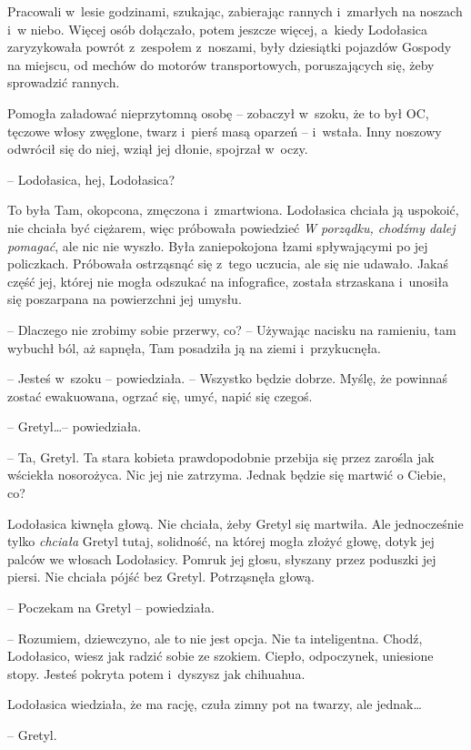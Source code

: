 \documentclass[oneside,polish,11pt,sfheadings]{mwbk}
\begin{document}
Pracowali w~lesie godzinami, szukając, zabierając rannych i~zmarłych na
noszach i~w niebo. Więcej osób dołączało, potem jeszcze więcej, a~kiedy
Lodołasica zaryzykowała powrót z~zespołem z~noszami, były dziesiątki
pojazdów Gospody na miejscu, od mechów do motorów transportowych,
poruszających się, żeby sprowadzić rannych.

Pomogła załadować nieprzytomną osobę -- zobaczył w~szoku, że to był OC,
tęczowe włosy zwęglone, twarz i~pierś masą oparzeń -- i~wstała. Inny
noszowy odwrócił się do niej, wziął jej dłonie, spojrzał w~oczy.

-- Lodołasica, hej, Lodołasica?

To była Tam, okopcona, zmęczona i~zmartwiona. Lodołasica chciała ją
uspokoić, nie chciała być ciężarem, więc próbowała powiedzieć \textit{W
porządku, chodźmy dalej pomagać}, ale nic nie wyszło. Była zaniepokojona
łzami spływającymi po jej policzkach. Próbowała ostrząsnąć się z~tego
uczucia, ale się nie udawało. Jakaś część jej, której nie mogła odszukać
na infografice, została strzaskana i~unosiła się poszarpana na
powierzchni jej umysłu.

-- Dlaczego nie zrobimy sobie przerwy, co? -- Używając nacisku na
ramieniu, tam wybuchł ból, aż sapnęła, Tam posadziła ją na ziemi i~przykucnęła. 

-- Jesteś w~szoku -- powiedziała. -- Wszystko będzie dobrze.
Myślę, że powinnaś zostać ewakuowana, ogrzać się, umyć, napić się
czegoś.

-- Gretyl\ldots  -- powiedziała.

-- Ta, Gretyl. Ta stara kobieta prawdopodobnie przebija się przez zarośla
jak wściekła nosorożyca. Nic jej nie zatrzyma. Jednak będzie się martwić
o Ciebie, co?

Lodołasica kiwnęła głową. Nie chciała, żeby Gretyl się martwiła. Ale
jednocześnie tylko \textit{chciała} Gretyl tutaj, solidność, na której
mogła złożyć głowę, dotyk jej palców we włosach Lodołasicy. Pomruk jej
głosu, słyszany przez poduszki jej piersi. Nie chciała pójść bez Gretyl.
Potrząsnęła głową.

-- Poczekam na Gretyl -- powiedziała.

-- Rozumiem, dziewczyno, ale to nie jest opcja. Nie ta inteligentna.
Chodź, Lodołasico, wiesz jak radzić sobie ze szokiem. Ciepło,
odpoczynek, uniesione stopy. Jesteś pokryta potem i~dyszysz jak
chihuahua.

Lodołasica wiedziała, że ma rację, czuła zimny pot na twarzy, ale
jednak\ldots 

-- Gretyl.
\end{document}

